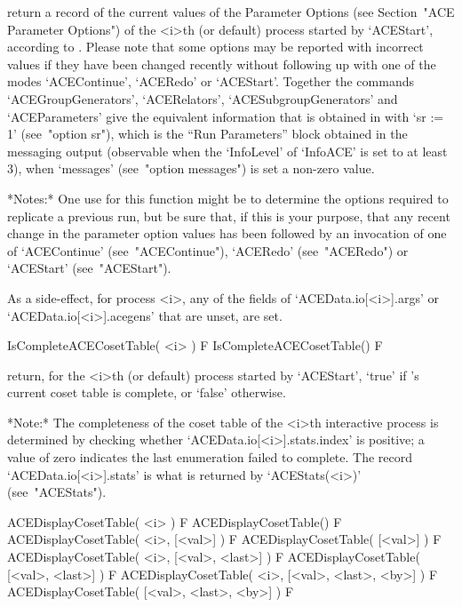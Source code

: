 return a record of the current values of the {\ACE} Parameter  Options
(see Section~"ACE  Parameter  Options")  of  the  <i>th  (or  default)
process started by `ACEStart', according to {\ACE}. Please  note  that
some options may be reported with incorrect values if they  have  been
changed  recently  without  following  up  with  one  of   the   modes
`ACEContinue',  `ACERedo'  or  `ACEStart'.   Together   the   commands
`ACEGroupGenerators',   `ACERelators',   `ACESubgroupGenerators'   and
`ACEParameters'  give  the  equivalent  {\GAP}  information  that   is
obtained in {\ACE} with `sr := 1'  (see~"option  sr"),  which  is  the
``Run Parameters'' block obtained in the messaging output  (observable
when the `InfoLevel'  of  `InfoACE'  is  set  to  at  least  3),  when
`messages' (see~"option messages") is set a non-zero value.

*Notes:*
One use for this function might be to determine the  options  required
to replicate a previous run,  but  be  sure  that,  if  this  is  your
purpose, that any recent change in the  parameter  option  values  has
been   followed   by   an   invocation   of   one   of   `ACEContinue'
(see~"ACEContinue"),   `ACERedo'   (see~"ACERedo")    or    `ACEStart'
(see~"ACEStart").

As a side-effect, for  {\ACE}  process  <i>,  any  of  the  fields  of
`ACEData.io[<i>].args' or `ACEData.io[<i>].acegens'  that  are  unset,
are set.

\>IsCompleteACECosetTable( <i> ) F
\>IsCompleteACECosetTable() F

return, for the <i>th (or  default)  process  started  by  `ACEStart',
`true' if  {\ACE}'s  current  coset  table  is  complete,  or  `false'
otherwise.

*Note:*
The completeness of the coset table of the  <i>th  interactive  {\ACE}
process      is       determined       by       checking       whether
`ACEData.io[<i>].stats.index' is positive; a value of  zero  indicates
the   last   enumeration    failed    to    complete.    The    record
`ACEData.io[<i>].stats'  is  what  is  returned   by   `ACEStats(<i>)'
(see~"ACEStats").

\>ACEDisplayCosetTable( <i> ) F
\>ACEDisplayCosetTable() F
\>ACEDisplayCosetTable( <i>, [<val>] ) F
\>ACEDisplayCosetTable( [<val>] ) F
\>ACEDisplayCosetTable( <i>, [<val>, <last>] ) F
\>ACEDisplayCosetTable( [<val>, <last>] ) F
\>ACEDisplayCosetTable( <i>, [<val>, <last>, <by>] ) F
\>ACEDisplayCosetTable( [<val>, <last>, <by>] ) F

